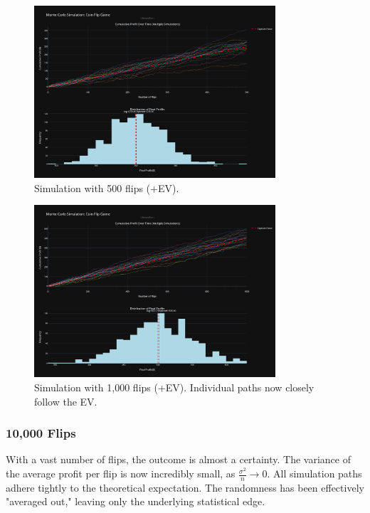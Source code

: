 \documentclass[12pt]{article}
\begin{document}
\begin{figure}[h!]
\centering
\includegraphics[width=0.8\textwidth]{+ev/500+ev.png}
\caption{Simulation with 500 flips (+EV).}
\end{figure}

\begin{figure}[h!]
\centering
\includegraphics[width=0.8\textwidth]{+ev/1000+ev.png}
\caption{Simulation with 1,000 flips (+EV). Individual paths now closely follow the EV.}
\end{figure}
\clearpage

\subsubsection{10,000 Flips}
With a vast number of flips, the outcome is almost a certainty. The variance of the average profit per flip is now incredibly small, as $\frac{\sigma^2}{n}\to 0$. All simulation paths adhere tightly to the theoretical expectation. The randomness has been effectively "averaged out," leaving only the underlying statistical edge.
\end{document}
